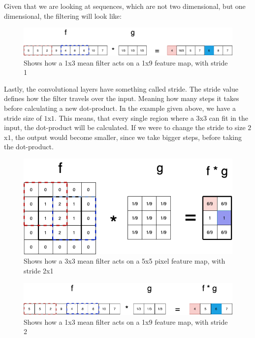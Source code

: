 \noindent
Given that we are looking at sequences, which are not two dimensional, but one dimensional, the filtering will look like:

\begin{figure}[!ht]
  \centering
  \includegraphics[scale=0.4]{latex/IMGs/conv2.png}
  \caption{Shows how a 1x3 mean filter acts on a 1x9 feature map, with stride 1}\label{Baseline:before}
\end{figure}

\noindent
Lastly, the convolutional layers have something called stride. The stride value defines how the filter travels over the input. Meaning how many steps it takes before calculating a new dot-product. In the example given above, we have a stride size of $1$x$1$. This means, that every single region where a $3$x$3$ can fit in the input, the dot-product will be calculated. If we were to change the stride to size $2$x$1$, the output would become smaller, since we take bigger steps, before taking the dot-product.

\begin{figure}[!ht]
  \centering
  \includegraphics[scale=0.4]{latex/IMGs/conv1_stride.png}
  \caption{Shows how a 3x3 mean filter acts on a 5x5 pixel feature map, with stride 2x1}\label{Baseline:before}
\end{figure}

\begin{figure}[!ht]
  \centering
  \includegraphics[scale=0.4]{latex/IMGs/conv2_stride.png}
  \caption{Shows how a 1x3 mean filter acts on a 1x9 feature map, with stride 2}\label{Baseline:before}
\end{figure}


